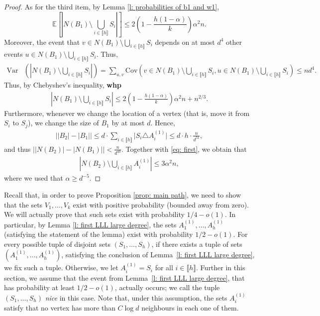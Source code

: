 \documentclass[notitlepage]{scrartcl}
\newcommand{\br}[1]{\llbracket{#1}\rrbracket}
\begin{document}
\begin{proof}
As for the third item, by Lemma \ref{l: probabilities of b1 and w1}, $$\mathbb{E}\left[\left|N(B_1)\setminus \bigcup_{i\in \br{h}}S_i\right|\right]\le 2\left(1-\frac{h(1-\alpha)}{k}\right)\alpha^2n.$$ Moreover, the event that $v\in N(B_1)\setminus \bigcup_{i\in \br{h}}S_i$ depends on at most $d^4$ other events $u\in N(B_1)\setminus \bigcup_{i\in \br{h}}S_i$. Thus, 
\begin{align*}
    \text{Var}&\left(\left|N(B_1)\setminus \bigcup_{i\in \br{h}}S_i\right|\right)=\sum_{u,v}\text{Cov}\left(v\in N(B_1)\setminus \bigcup_{i\in \br{h}}S_i, u\in N(B_1)\setminus \bigcup_{i\in \br{h}}S_i\right)\le nd^4.
\end{align*}
Thus, by Chebyshev's inequality, \textbf{whp}
\begin{align}
    \left|N(B_1)\setminus \bigcup_{i\in \br{h}}S_i\right|\le 2\left(1-\frac{h(1-\alpha)}{k}\right)\alpha^2n+n^{2/3}.\label{eq: first}    
\end{align}
Furthermore, whenever we change the location of a vertex (that is, move it from $S_i$ to $S_j$), we change the size of $B_1$ by at most $d$. Hence, 
\begin{align*}
    \big||B_2|-|B_1|\big|\le d\cdot \sum_{i\in \br{h}}\big|S_i\triangle A_i^{(1)}\big|\le d\cdot h\cdot \frac{n}{d^{51}},
\end{align*}
and thus
$
    \left|\left|N\left(B_2\right)\right|-\left|N\left(B_1\right)\right|\right|<\frac{n}{d^{40}}.
$
Together with \eqref{eq: first}, we obtain that
\begin{align*}
    \left|N(B_2)\setminus \bigcup_{i\in \br{h}}A_i^{(1)}\right|\le 3\alpha^2n,
\end{align*}
where we used that $\alpha\ge d^{-5}$.
\end{proof}

Recall that, in order to prove Proposition \ref{prop: main path}, we need to show that the sets $V_1,\ldots, V_k$ exist with positive probability (bounded away from zero). We will actually prove that such sets exist with probability $1/4-o(1)$. In particular, by Lemma \ref{l: first LLL large degree}, the sets $A_1^{(1)},\ldots, A_h^{(1)}$ (satisfying the statement of the lemma) exist with probability $1/2-o(1)$. For every possible tuple of disjoint sets $(S_1,\ldots,S_h)$, if there exists a tuple of sets $(A_1^{(1)},\ldots,A_h^{(1)})$, satisfying the conclusion of Lemma~\ref{l: first LLL large degree}, we fix such a tuple. Otherwise, we let $A_i^{(1)}=S_i$ for all $i\in \br{h}$. Further in this section, we assume that the event from Lemma~\ref{l: first LLL large degree}, that has probability at least $1/2-o(1)$, actually occurs; we call the tuple $(S_1,\ldots,S_h)$ \emph{nice} in this case.
Note that, under this assumption, the sets $A_i^{(1)}$ satisfy that no vertex has more than $C\log d$ neighbours in each one of them.
\end{document}

